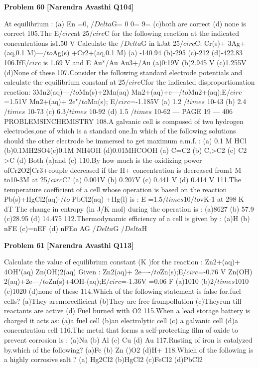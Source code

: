 \begin{problembox}
\textbf{Problem 60} \hfill \textbf{[Narendra Avasthi Q104]}
\label{q:ext-narendra_avasthi_all_questions-60}

At equilibrium :
(a) En =0, $/Delta$G= 0
0= 9=
(c)both are correct
(d) none is correct
105.The E$/circ$at 25$/circ$C for the following reaction at the indicated concentrations is1.50 V Calculate
the $/Delta$G in kJat 25$/circ$C:
Cr(s)+ 3Ag+(aq,0.1 M)---$/to$Ag(s) +Cr$2$+(aq,0.1 M)
(a) -140.94
(b)-295
(c)-212
(d)-422.83
106.IfE$/circ$
is 1.69 V and E
Au*/Au
Au3+/Au
(a)0:19V
(b)2.945 V
(c)1.255V
(d)None of these
107.Consider the following standard electrode potentials and calculate the equilibrium constanf at
25$/circ$Cfor the indicated disproportionation reaction:
3Mn$2$(aq)---$/to$Mn(s)+2Mn(aq)
Mn$2$+(aq)+e---$/to$Mn$2$+(aq);E$/circ$=1.51V
Mn$2$+(aq)+ 2e"$/to$Mn(s);
E$/circ$=-1.185V
(a) 1.2 $/times$ 10-43
(b) 2.4 $/times$ 10-73
(c) 6.3$/times$ 10-92
(d) 1.5 $/times$ 10-62
--- PAGE 19 ---
406
PROBLEMSINCHEMISTRY
108.A galvanic cell is composed of two hydrogen electrodes,one of which is a standard one.In
which of the following solutions should the other electrode be immersed to get maximum
e.m.f. :
(a) 0.1 M HCl
(b)0.1MH2SO4(c)0.1M NH4OH
(d)0.01MHCOOH
(a) C=C2
(b) C,>C2
(c) C2 >C
(d) Both (a)and (c)
110.By how much is the oxidizing power ofCr2O2|Cr3+couple decreased if the H+ concentration
is decreased from1 M to10-3M at 25$/circ$C?
(a) 0.001V
(b) 0.207V
(c) 0.441 V
(d) 0.414 V
111.The temperature coefficient of a cell whose operation is based on the reaction
Pb(s)+HgCl2(aq)-$/to$ PbCl2(aq) +Hg(l) is :
E
=1.5$/times$10$/to$vK-1 at 298 K
dT
The change in entropy (in J/K mol) during the operation is :
(a)8627
(b) 57.9
(c)28.95
(d) 14.475
112.Thermodynamic efficiency of a cell is given by :
(a)H
(b) nFE
(c)=nEF
(d) nFEo
AG
$/Delta$G
$/Delta$H
\end{problembox}

\begin{problembox}
\textbf{Problem 61} \hfill \textbf{[Narendra Avasthi Q113]}
\label{q:ext-narendra_avasthi_all_questions-61}

Calculate the value of equilibrium constant (K )for the reaction :
Zn$2$+(aq)+ 4OH"(aq) Zn(OH)$2$(aq)
Given :
Zn$2$(aq)+ 2e----$/to$Zn(s);E$/circ$=-0.76 V
Zn(OH)$2$(aq)+2e---$/to$Zn(s)+4OH-(aq);E$/circ$=-1.36V
=0.06
F
(a)1010
(b)2$/times$1010
(c)1020
(d)none of these
114.Which of the following statement is false for.fuel cells?
(a)They aremoreefficient
(b)They are free frompollution
(c)Theyrun till reactants are active
(d) Fuel burned with O2
115.When a lead storage battery is charged it acts as:
(a)a fuel cell
(b)an electrolytic cell
(c) a galvanic cell
(d)a concentration cell
116.The metal that forms a self-protecting film of oxide to prevent corrosion is :
(a)Na
(b) Al
(c) Cu
(d) Au
117.Rusting of iron is catalyzed by.which of the following?
(a)Fe
(b) Zn
()O2
(d)H+
118.Which of the following is a highly corrosive salt ?
(a) Hg2Cl2
(b)HgCl2
(c)FeCl2
(d)PbCl2
\end{problembox}

